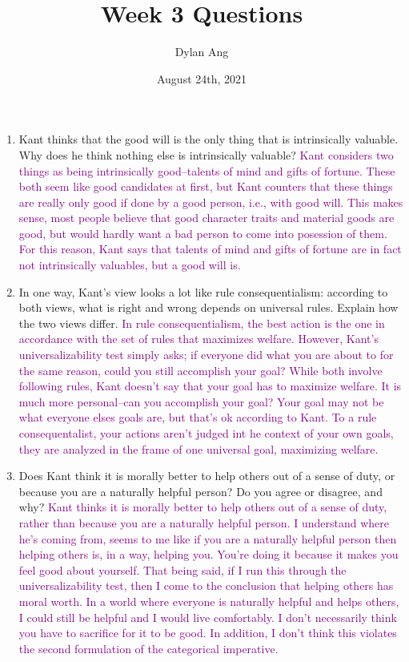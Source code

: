 \documentclass[12pt]{article}
\title{Week 3 Questions}
\author{Dylan Ang}
\date{August 24th, 2021}
\newcommand{\ans}[1]{\textcolor{purple}{#1}}
\begin{document}
\maketitle

\begin{enumerate}
    \item Kant thinks that the good will is the only thing that is intrinsically valuable. Why does he think nothing else is intrinsically valuable?
          \ans{Kant considers two things as being intrinsically good--talents of mind and gifts of fortune. These both seem like good candidates at first, but Kant counters that these things are really only good if done by a good person, i.e., with good will. This makes sense, most people believe that good character traits and material goods are good, but would hardly want a bad person to come into posession of them. For this reason, Kant says that talents of mind and gifts of fortune are in fact not intrinsically valuables, but a good will is.}
    \item In one way, Kant's view looks a lot like rule consequentialism: according to both views, what is right and wrong depends on universal rules. Explain how the two views differ.
          \ans{In rule consequentialism, the best action is the one in accordance with the set of rules that maximizes welfare. However, Kant's universalizability test simply asks; if everyone did what you are about to for the same reason, could you still accomplish your goal? While both involve following rules, Kant doesn't say that your goal has to maximize welfare. It is much more personal--can you accomplish your goal? Your goal may not be what everyone elses goals are, but that's ok according to Kant. To a rule consequentalist, your actions aren't judged int he context of your own goals, they are analyzed in the frame of one universal goal, maximizing welfare.}
    \item Does Kant think it is morally better to help others out of a sense of duty, or because you are a naturally helpful person? Do you agree or disagree, and why?
          \ans{Kant thinks it is morally better to help others out of a sense of duty, rather than because you are a naturally helpful person. I understand where he's coming from, seems to me like if you are a naturally helpful person then helping others is, in a way, helping you. You're doing it because it makes you feel good about yourself. That being said, if I run this through the universalizability test, then I come to the conclusion that helping others has moral worth. In a world where everyone is naturally helpful and helps others, I could still be helpful and I would live comfortably. I don't necessarily think you have to sacrifice for it to be good. In addition, I don't think this violates the second formulation of the categorical imperative.}

\end{enumerate}
\end{document}
